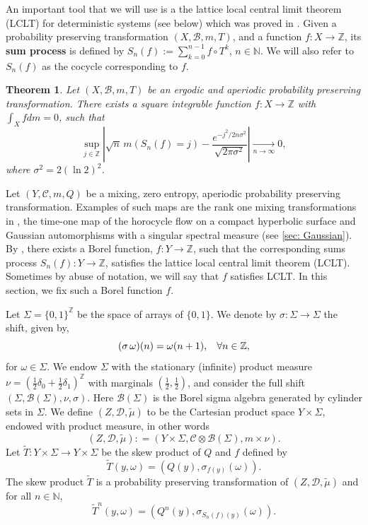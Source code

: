 \documentclass[12pt,reqno]{amsart}
\newcommand{\N}{\mathbb{N}}
\newcommand{\Z}{\mathbb{Z}}
\newcommand{\B}{\mathcal{B}}
\newcommand{\TT}{\widetilde{T}}
\newcommand{\Tmu}{\widetilde{\mu}}
\newtheorem{thm}{Theorem}[section]
\theoremstyle{definition}
\begin{document}
An important tool that we will use is a the lattice local central limit theorem (LCLT) for deterministic systems (see  below) which was proved in \cite{MR4374685}. Given a probability preserving transformation $(X,\B,m,T)$, and a function $f:X\to \Z$, its \textbf{sum process} is defined by $S_n(f):=\sum_{k=0}^{n-1}f\circ T^k$, $n\in\mathbb{N}$. We will also refer to $S_n(f)$ as the cocycle corresponding to $f$. 

\begin{thm}\cite{MR4374685}\label{thm:LCLT_1}
Let $(X,\B,m,T)$ be an ergodic and aperiodic probability preserving transformation. There exists a square integrable function $f:X\to \Z$ with $\int_X fdm = 0$, such that
\[
\sup_{j\in\Z} \left|\sqrt{n}\, m\left(S_n(f)=j\right) -\frac{e^{-j^2/2n\sigma^2}}{\sqrt{2\pi \sigma^2}}\right|\xrightarrow[n\to\infty]{}0,
\]
where $\sigma^2=2 (\ln 2)^2$.
\end{thm}

Let $(Y,\mathcal{C},m,Q)$ be a mixing, zero entropy, aperiodic probability preserving transformation. Examples of such maps are the rank one mixing transformations in \cite{MR1443143,MR2652597}, the time-one map of the horocycle flow on a compact hyperbolic surface and Gaussian automorphisms with a singular spectral measure (see \cref{sec: Gaussian}). By , there exists a Borel function, $f: Y \rightarrow \Z$, such that the corresponding sums process $S_n(f) : Y \rightarrow \Z$, satisfies the lattice local central limit theorem (LCLT). Sometimes by abuse of notation, we will say that $f$ satisfies LCLT. In this section, we fix such a Borel function $f$.

Let $\Sigma = \{0,1\}^{\Z}$ be the space of arrays of $\{0,1\}$. We denote by $\sigma : \Sigma \rightarrow \Sigma$ the shift, given by, 
\[
(\sigma \, \omega) (n) = \omega (n+1), \hspace{3mm} \forall n \in \Z,
\]
for $\omega\in \Sigma$. We endow $\Sigma$ with the stationary (infinite) product measure $\nu=\left(\frac{1}{2}\delta_0+\frac{1}{2}\delta_1\right)^{\Z}$ with marginals $\left(\frac{1}{2},\frac{1}{2}\right)$, and consider the full shift $(\Sigma, \B(\Sigma), \nu, \sigma)$. Here $\B(\Sigma)$ is the Borel sigma algebra generated by cylinder sets in $\Sigma$. We define $(Z,\mathcal{D},\Tmu)$ to be the Cartesian product space $Y \times \Sigma$, endowed with product measure, in other words
\[(Z,\mathcal{D},\Tmu) : = (Y \times \Sigma, \mathcal{C} \otimes \B(\Sigma), m \times \nu).\]
Let  $\TT : Y \times \Sigma \rightarrow Y \times \Sigma$ be the skew product of $Q$ and $f$ defined by 
\begin{equation}\label{eq:TT}
    \TT (y, \omega) = (Q (y), \sigma_{f(y)} (\omega)).
\end{equation}
The skew product $\TT$ is a probability preserving transformation of $(Z,\mathcal{D},\Tmu)$ and for all $n\in\N$,
\begin{equation}\label{eq:TT^n_1}
    \TT^n (y, \omega) = (Q^n(y), \sigma_{S_n(f)(y)} (\omega)).
\end{equation}
\end{document}
